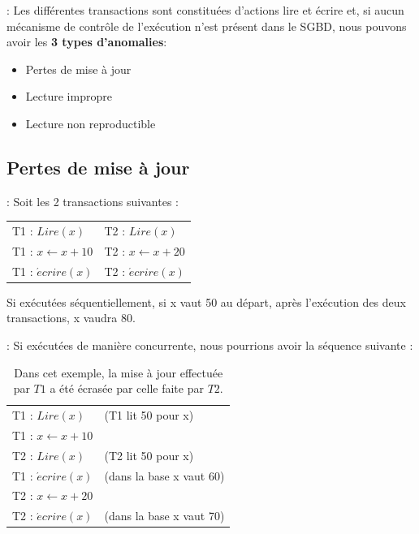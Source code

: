 \documentclass[10pt]{beamer}
\begin{document}
\begin{frame}{\secname : \subsecname}
    Les différentes transactions sont constituées d'actions lire et écrire et, si aucun mécanisme de contrôle de l'exécution n'est présent dans le SGBD, nous pouvons avoir les \textbf{3 types d'anomalies}:
    \begin{itemize}
        \item Pertes de mise à jour
        \item Lecture impropre
        \item Lecture non reproductible
    \end{itemize}
\end{frame}
\subsection{Pertes de mise à jour}
\begin{frame}{\secname : \subsecname}
    Soit les 2 transactions suivantes :
    \begin{table}[]
        \begin{tabular}{ll}
            T1 :  $Lire (x)$               & T2 :  $Lire (x)$               \\
            T1 : $x \longleftarrow x + 10$ & T2 : $x \longleftarrow x + 20$ \\
            T1 : $\acute{e}crire (x)$      & T2 : $\acute{e}crire (x)$
        \end{tabular}
    \end{table}
    Si exécutées séquentiellement, si x vaut 50 au départ, après l'exécution des deux transactions, x vaudra 80.
\end{frame}

\begin{frame}{\secname : \subsecname}
    Si exécutées de manière concurrente, nous pourrions avoir la séquence suivante :
    \begin{table}[]
        \begin{tabular}{ll}
            T1 :  $Lire (x)$               & (T1 lit 50 pour x)       \\
            T1 : $x \longleftarrow x + 10$ &                          \\
            T2 : $Lire (x)$                & (T2 lit 50 pour x)       \\
            T1 : $\acute{e}crire (x)$      & (dans la base x vaut 60) \\
            T2 : $x \longleftarrow x + 20$ &                          \\
            T2 : $\acute{e}crire (x)$      & (dans la base x vaut 70)
        \end{tabular}
        \caption*{Dans cet exemple, la mise à jour effectuée par $T1$ a été écrasée par celle faite par $T2$.}
    \end{table}
\end{frame}
\end{document}
